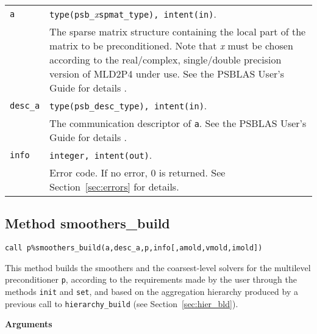 \begin{tabular}{p{1.2cm}p{12cm}}
\verb|a|      & \verb|type(psb_|\emph{x}\verb|spmat_type), intent(in)|. \\
              & The sparse matrix structure containing the local part of the
                matrix to be preconditioned. Note that \emph{x} must be chosen according
                to the real/complex, 
single/double precision version of MLD2P4 under use.
                See the PSBLAS User's Guide for details \cite{PSBLASGUIDE}.\\
\verb|desc_a| & \verb|type(psb_desc_type), intent(in)|. \\
              & The communication descriptor of \verb|a|. See the PSBLAS User's Guide for
                details \cite{PSBLASGUIDE}.\\
\verb|info|   & \verb|integer, intent(out)|.\\
              & Error code. If no error, 0 is returned. See Section~\ref{sec:errors} for details.\\
\end{tabular}


\clearpage

\subsection{Method smoothers\_build\label{sec:smooth_bld}}
 

\begin{center}
\verb|call p%smoothers_build(a,desc_a,p,info[,amold,vmold,imold])|\\
\end{center}

\noindent
This method builds the smoothers and the coarsest-level solvers for the
multilevel preconditioner \verb|p|, according to the requirements made by
the user through the methods \verb|init| and \verb|set|, and based on the aggregation
hierarchy produced by a previous call to \verb|hierarchy_build|
(see Section~\ref{sec:hier_bld}). 

{\baselineskip\noindent\large\bfseries Arguments} \smallskip

